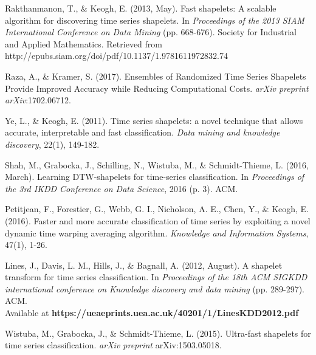 \documentclass[10pt,a4paper]{article}
\begin{document}
\pagebreak
\begin{thebibliography}{9}

Rakthanmanon, T., \& Keogh, E. (2013, May). Fast shapelets: A scalable algorithm for discovering time series shapelets. In \textit{Proceedings of the 2013 SIAM International Conference on Data Mining} (pp. 668-676). Society for Industrial and Applied Mathematics.
Retrieved from http://epubs.siam.org/doi/pdf/10.1137/1.9781611972832.74 

Raza, A., \& Kramer, S. (2017). Ensembles of Randomized Time Series Shapelets Provide Improved Accuracy while Reducing Computational Costs. \textit{arXiv preprint arXiv}:1702.06712.

Ye, L., \& Keogh, E. (2011). Time series shapelets: a novel technique that allows accurate, interpretable and fast classification. \textit{Data mining and knowledge discovery}, 22(1), 149-182.

Shah, M., Grabocka, J., Schilling, N., Wistuba, M., \& Schmidt-Thieme, L. (2016, March). Learning DTW-shapelets for time-series classification. In \textit{Proceedings of the 3rd IKDD Conference on Data Science}, 2016 (p. 3). ACM.

Petitjean, F., Forestier, G., Webb, G. I., Nicholson, A. E., Chen, Y., \& Keogh, E. (2016). Faster and more accurate classification of time series by exploiting a novel dynamic time warping averaging algorithm. \textit{Knowledge and Information Systems}, 47(1), 1-26.

Lines, J., Davis, L. M., Hills, J., \& Bagnall, A. (2012, August). A shapelet transform for time series classification. In \textit{Proceedings of the 18th ACM SIGKDD international conference on Knowledge discovery and data mining} (pp. 289-297). ACM.\\
Available at \textbf{https://ueaeprints.uea.ac.uk/40201/1/LinesKDD2012.pdf}

Wistuba, M., Grabocka, J., \& Schmidt-Thieme, L. (2015). Ultra-fast shapelets for time series classification. \textit{arXiv preprint} arXiv:1503.05018.

\end{thebibliography}
\end{document}

